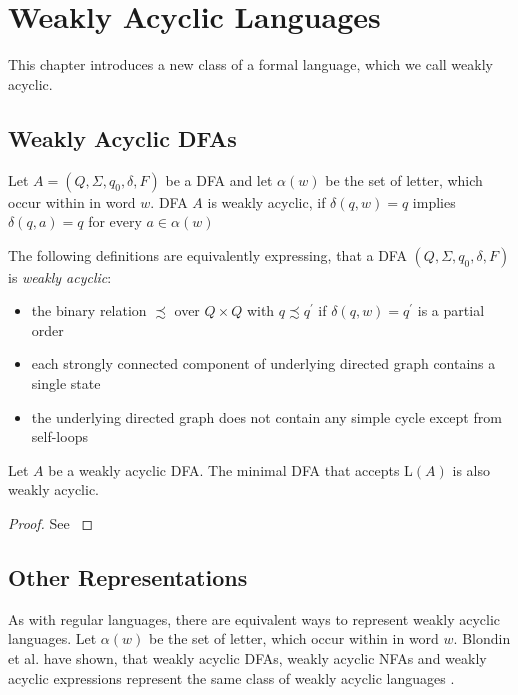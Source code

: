 \chapter{Weakly Acyclic Languages}\label{chapter:weakly_acyclic_language}

This chapter introduces a new class of a formal language, which we call weakly acyclic. 

\section{Weakly Acyclic DFAs}\label{sec:weakly_acyclic_dfa}

\begin{definition}
Let $A = (Q, \Sigma, q_{0},\delta,F)$ be a DFA and let $\alpha(w)$ be the set of letter, which occur within in word $w$. DFA $A$ is weakly acyclic, if $\delta(q,w) = q$ implies $\delta(q,a) = q$ for every $a \in \alpha(w)$
\end{definition}

The following definitions are equivalently expressing, that a DFA $(Q, \Sigma, q_{0},\delta,F)$ is \textit{weakly acyclic}:
\begin{itemize}[--,noitemsep]
	\item the binary relation $\precsim $  over $Q \times Q$ with $q \precsim q^{'}$ if $\delta(q,w) = q^{'}$ is a partial order
	\item each strongly connected component of underlying directed graph contains a single state 
	\item the underlying directed graph does not contain any simple cycle except from self-loops
\end{itemize}


\begin{lemma}\label{lem:minimal}
Let $A$ be a weakly acyclic DFA. The minimal DFA that accepts L$(A)$ is also weakly acyclic. 
\end{lemma}

\begin{proof}
See {\cite[Proposition~4]{blondin_24}}
\end{proof}


\section{Other Representations}

As with regular languages, there are equivalent ways to represent weakly acyclic languages. Let $\alpha(w)$ be the set of letter, which occur within in word $w$. 
Blondin et al. have shown, that weakly acyclic DFAs, weakly acyclic NFAs and weakly acyclic expressions represent the same class of weakly acyclic languages \cite{blondin_24}. 



